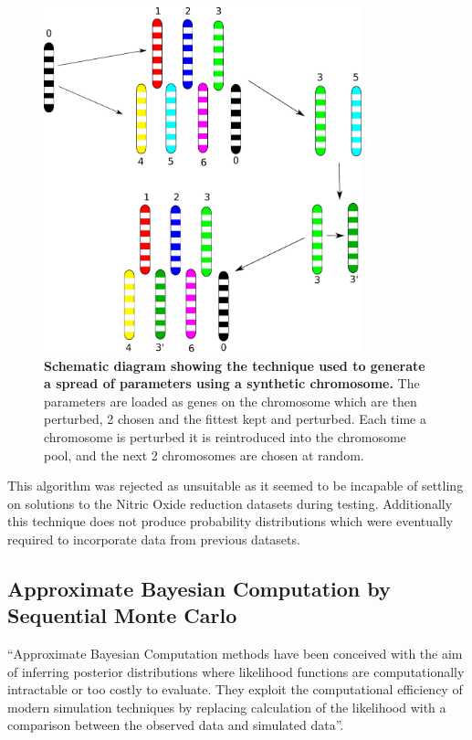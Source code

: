 \begin{figure}[tbp]
\begin{center}
\includegraphics[height=10cm]{./03-parameterestimationmethodologies/data/sa_spread.pdf}
\end{center}
\caption[{Schematic diagram showing the technique used to generate a spread of parameters using a synthetic chromosome.}]{{\bf Schematic diagram showing the technique used to generate a spread of parameters using a synthetic chromosome.} The parameters are loaded as genes on the chromosome which are then perturbed, 2 chosen and the fittest kept and perturbed. Each time a chromosome is perturbed it is reintroduced into the chromosome pool, and the next 2 chromosomes are chosen at random.
\label{fig:sa_spread}}
\end{figure}

This algorithm was rejected as unsuitable as it seemed to be incapable of settling on solutions to the Nitric Oxide reduction datasets during testing. Additionally this technique does not produce probability distributions which were eventually required to incorporate data from previous datasets.

\subsection{Approximate Bayesian Computation by Sequential Monte Carlo}
``Approximate Bayesian Computation methods have been conceived with the aim of inferring posterior distributions where likelihood functions are computationally intractable or too costly to evaluate. They exploit the computational efficiency of modern simulation techniques by replacing calculation of the likelihood with a comparison between the observed data and simulated data''\cite{Toni2009}.

